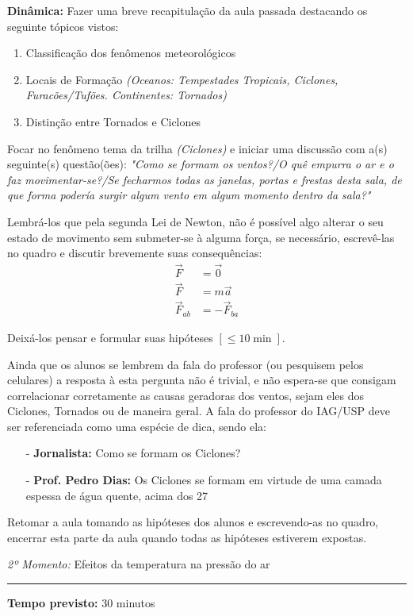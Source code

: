 \noindent\textbf{Dinâmica:}  Fazer uma breve recapitulação da aula passada destacando os seguinte tópicos vistos:
\begin{enumerate}[label=\alph *)]
		\item Classificação dos fenômenos meteorológicos
		\item Locais de Formação \textit{(Oceanos: Tempestades Tropicais, Ciclones, Furacões/Tufões. Continentes: Tornados)}
		\item Distinção entre Tornados e Ciclones
\end{enumerate}

Focar no fenômeno tema da trilha \textit{(Ciclones)} e iniciar uma discussão com a(s) seguinte(s) questão(ões): \textit{"Como se formam os ventos?/O quê empurra o ar e o faz movimentar-se?/Se fecharmos todas as janelas, portas e frestas desta sala, de que forma podería surgir algum vento em algum momento dentro da sala?"}

Lembrá-los que pela segunda Lei de Newton, não é possível algo alterar o seu estado de movimento sem submeter-se à alguma força, se necessário, escrevê-las no quadro e discutir brevemente suas consequências: 
\begin{align}
	\vec{F} &= \vec{0}\\
	\vec{F} &= m \vec{a}\\
	\vec{F}_{ab} &= -\vec{F}_{ba}
\end{align}

Deixá-los pensar e formular suas hipóteses $[\leq 10\min]$.

Ainda que os alunos se lembrem da fala do professor (ou pesquisem pelos celulares) a resposta à esta pergunta não é trivial, e não espera-se que consigam correlacionar corretamente as causas geradoras dos ventos, sejam eles dos Ciclones, Tornados ou de maneira geral. A fala do professor do IAG/USP deve ser referenciada como uma espécie de dica, sendo ela: 
\begin{itemize}
	\item[-] \textbf{Jornalista:} Como se formam os Ciclones?
	\item[-] \textbf{Prof. Pedro Dias:} Os Ciclones se formam em virtude de uma camada espessa de água quente, acima dos 27\Celsius [...]
\end{itemize}
Retomar a aula tomando as hipóteses dos alunos e escrevendo-as no quadro, encerrar esta parte da aula quando todas as hipóteses estiverem expostas.


\vspace{50pt}
\noindent\emph{2º Momento:} Efeitos da temperatura na pressão do ar 
\par\noindent\rule{.3\textwidth}{.5pt}    
\par\noindent\textbf{Tempo previsto:} 30 minutos


